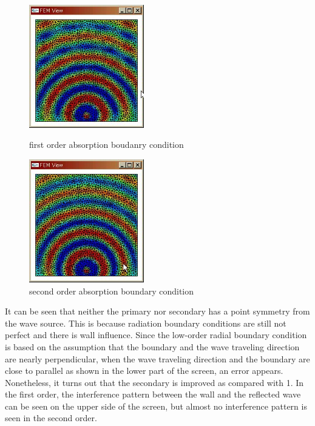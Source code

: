 \begin{figure}[htbp]
\begin{center}
 \begin{minipage}{0.45\hsize}
  \begin{center}
   \includegraphics[bb=0 0 300 300,width=5cm]{images/abc_bound_1st.jpg}
  \end{center}
  \caption{first order absorption boudanry condition}
  \label{fig:abc_bound_1st}
 \end{minipage}
 \begin{minipage}{0.45\hsize}
  \begin{center}
   \includegraphics[bb=0 0 300 300,width=5cm]{images/abc_bound_2nd.jpg}
  \end{center}
  \caption{second order absorption boundary condition}
  \label{fig:abc_bound_2nd}
 \end{minipage}
\end{center}
\end{figure}


It can be seen that neither the primary nor secondary has a point symmetry from the wave source. This is because radiation boundary conditions are still not perfect and there is wall influence. Since the low-order radial boundary condition is based on the assumption that the boundary and the wave traveling direction are nearly perpendicular, when the wave traveling direction and the boundary are close to parallel as shown in the lower part of the screen, an error appears. Nonetheless, it turns out that the secondary is improved as compared with 1. In the first order, the interference pattern between the wall and the reflected wave can be seen on the upper side of the screen, but almost no interference pattern is seen in the second order.









